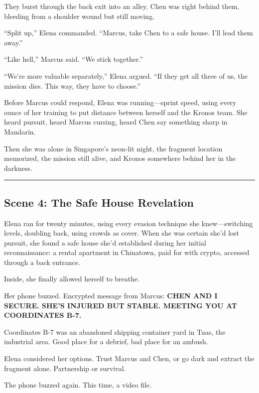 They burst through the back exit into an alley. Chen was right behind them, bleeding from a shoulder wound but still moving.

``Split up,'' Elena commanded. ``Marcus, take Chen to a safe house. I'll lead them away.''

``Like hell,'' Marcus said. ``We stick together.''

``We're more valuable separately,'' Elena argued. ``If they get all three of us, the mission dies. This way, they have to choose.''

Before Marcus could respond, Elena was running---sprint speed, using every ounce of her training to put distance between herself and the Kronos team. She heard pursuit, heard Marcus cursing, heard Chen say something sharp in Mandarin.

Then she was alone in Singapore's neon-lit night, the fragment location memorized, the mission still alive, and Kronos somewhere behind her in the darkness.

\begin{center}\rule{0.5\linewidth}{0.5pt}\end{center}

\hypertarget{scene-4-the-safe-house-revelation}{%
\subsection{Scene 4: The Safe House Revelation}\label{scene-4-the-safe-house-revelation}}

Elena ran for twenty minutes, using every evasion technique she knew---switching levels, doubling back, using crowds as cover. When she was certain she'd lost pursuit, she found a safe house she'd established during her initial reconnaissance: a rental apartment in Chinatown, paid for with crypto, accessed through a back entrance.

Inside, she finally allowed herself to breathe.

Her phone buzzed. Encrypted message from Marcus: \textbf{CHEN AND I SECURE. SHE'S INJURED BUT STABLE. MEETING YOU AT COORDINATES B-7.}

Coordinates B-7 was an abandoned shipping container yard in Tuas, the industrial area. Good place for a debrief, bad place for an ambush.

Elena considered her options. Trust Marcus and Chen, or go dark and extract the fragment alone. Partnership or survival.

The phone buzzed again. This time, a video file.

